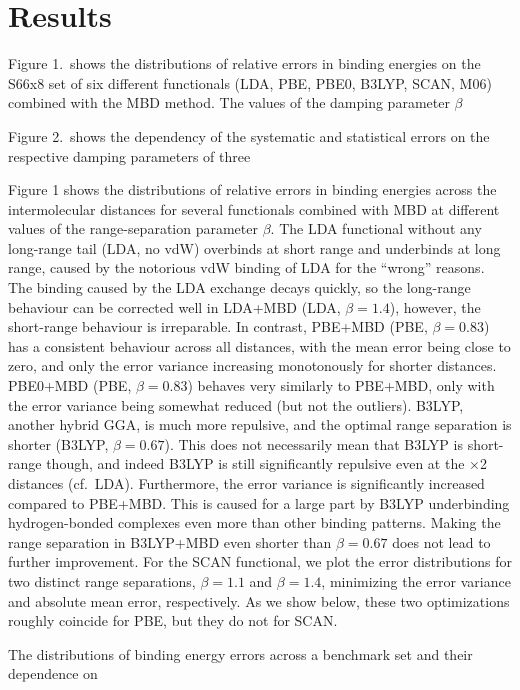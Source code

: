 \section{Results}

Figure 1.\ shows the distributions of relative errors in binding energies on the S66x8 set of six different functionals (LDA, PBE, PBE0, B3LYP, SCAN, M06) combined with the MBD method.
The values of the damping parameter $\beta$

Figure 2.\ shows the dependency of the systematic and statistical errors on the respective damping parameters of three

Figure 1 shows the distributions of relative errors in binding energies across the intermolecular distances for several functionals combined with MBD at different values of the range-separation parameter $\beta$.
The LDA functional without any long-range tail (LDA, no vdW) overbinds at short range and underbinds at long range, caused by the notorious vdW binding of LDA for the ``wrong'' reasons.
The binding caused by the LDA exchange decays quickly, so the long-range behaviour can be corrected well in LDA+MBD (LDA, $\beta=1.4$), however, the short-range behaviour is irreparable.
In contrast, PBE+MBD (PBE, $\beta=0.83$) has a consistent behaviour across all distances, with the mean error being close to zero, and only the error variance increasing monotonously for shorter distances.
PBE0+MBD (PBE, $\beta=0.83$) behaves very similarly to PBE+MBD, only with the error variance being somewhat reduced (but not the outliers).
B3LYP, another hybrid GGA, is much more repulsive, and the optimal range separation is shorter (B3LYP, $\beta=0.67$).
This does not necessarily mean that B3LYP is short-range though, and indeed B3LYP is still significantly repulsive even at the $\times$2 distances (cf.\ LDA).
Furthermore, the error variance is significantly increased compared to PBE+MBD\@.
This is caused for a large part by B3LYP underbinding hydrogen-bonded complexes even more than other binding patterns.
Making the range separation in B3LYP+MBD even shorter than $\beta=0.67$ does not lead to further improvement.
For the SCAN functional, we plot the error distributions for two distinct range separations, $\beta=1.1$ and $\beta=1.4$, minimizing the error variance and absolute mean error, respectively.
As we show below, these two optimizations roughly coincide for PBE, but they do not for SCAN\@.

The distributions of binding energy errors across a benchmark set and their dependence on 

